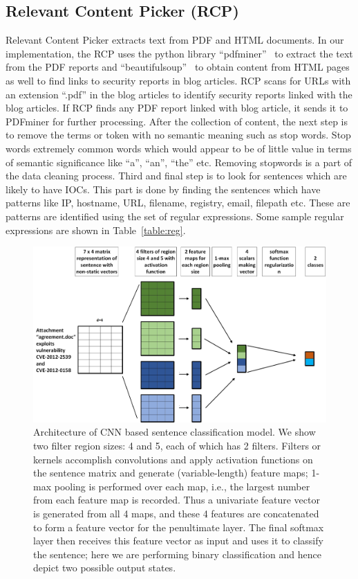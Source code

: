 \subsection{Relevant Content Picker (RCP)}
Relevant Content Picker extracts text from PDF and HTML documents. In our implementation, the RCP uses the python library ``pdfminer''~\cite{pdfminer} to extract the text from the PDF reports and ``beautifulsoup''~\cite{beautifulsoup} to obtain content from HTML pages as well to find links to security reports in blog articles. RCP scans for URLs with an extension ``.pdf'' in the blog articles to identify security reports linked with the blog articles. If RCP finds any PDF report linked with blog article, it sends it to PDFminer for further processing. After the collection of content, the next step is to remove the terms or token with no semantic meaning such as stop words. Stop words extremely common words which would appear to be of little value in terms of semantic significance like ``a'', ``an'', ``the'' etc. Removing stopwords is a part of the data cleaning process. Third and final step is to look for sentences which are likely to have IOCs. This part is done by finding the sentences which have patterns like IP, hostname, URL, filename, registry, email, filepath etc. These are patterns are identified using the set of regular expressions. Some sample regular expressions are shown in Table~\ref{table:reg}. 




\begin{figure}[tb]
\centering
\includegraphics [width=\linewidth]{CNN_sentence.jpg}
\caption{Architecture of CNN based sentence classification model. We show two filter region sizes: 4 and 5, each of which has 2 filters. Filters or kernels accomplish convolutions and apply activation functions on the sentence matrix and generate (variable-length) feature maps; 1-max pooling is performed over each map, i.e., the largest number from each feature map is recorded. Thus a univariate feature vector is generated from all 4 maps, and these 4 features are concatenated to form a feature vector for the penultimate layer. The final softmax layer then receives this feature vector as input and uses it to classify the sentence; here we are performing binary classification and hence depict two possible output states.}
\label{fig:CNNsentence}
\end{figure}

